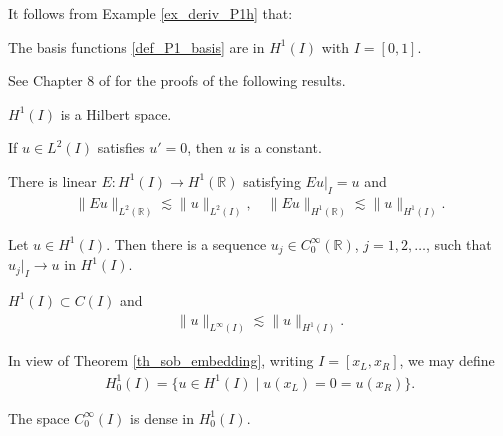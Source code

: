 \documentclass[12pt,oneside,final]{amsart}
\def\R{\mathbb R}
\begin{document}
It follows from Example \ref{ex_deriv_P1h} that: 

\begin{example}\label{ex_P1_basis}
The basis functions \eqref{def_P1_basis} are in $H^1(I)$ with $I = [0,1]$.
\end{example}

See Chapter 8 of \cite{Brezis} for the proofs of the following results.

\begin{theorem}
$H^1(I)$ is a Hilbert space.
\end{theorem}

\begin{lemma}
If $u \in L^2(I)$ satisfies $u' = 0$, then $u$ is a constant. 
\end{lemma}

\begin{theorem}[Extension, Th. 8.6]
There is linear $E : H^1(I) \to H^1(\R)$
satisfying $E u|_{I} = u$ and
    \begin{align*}
\|E u\|_{L^2(\R)} \lesssim \|u\|_{L^2(I)},
\quad 
\|E u\|_{H^1(\R)} \lesssim \|u\|_{H^1(I)}.
    \end{align*}
\end{theorem}

\begin{theorem}[Density in $H^1$, Th. 8.7]\label{th_density_H1}
Let $u \in H^1(I)$. Then there is a sequence $u_j \in C_0^\infty(\R)$, $j=1,2,\dots$, such that $u_j|_{I} \to u$ in $H^1(I)$.
\end{theorem}

\begin{theorem}\label{th_sob_embedding}
$H^1(I) \subset C(I)$ and 
    \begin{align*}
\|u\|_{L^\infty(I)} \lesssim \|u\|_{H^1(I)}.
    \end{align*}
\end{theorem}

In view of Theorem \ref{th_sob_embedding}, writing $I=[x_L, x_R]$, we may define
    \begin{align*}
H_0^1(I) = \{u \in H^1(I) \mid u(x_L) = 0 = u(x_R) \}.
    \end{align*}

\begin{theorem}[Density in $H^1_0$, Th. 8.12]\label{th_density_H01}
The space $C_0^\infty(I)$ is dense in $H^1_0(I)$.
\end{theorem}
\end{document}
